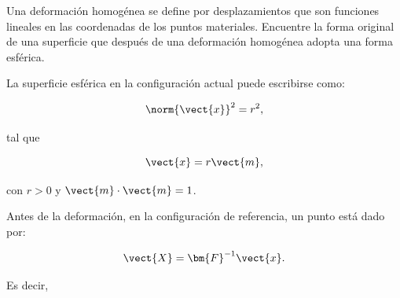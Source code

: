 \documentclass[../main.tex]{subfiles}
\begin{document}
\begin{problema}[3]
	Una deformación homogénea se define por desplazamientos que son funciones
	lineales en las coordenadas de los puntos materiales. Encuentre la forma
	original de una superficie que después de una deformación homogénea adopta
	una forma esférica.

	\startsolution

	La superficie esférica en la configuración actual puede escribirse como:

	\begin{equation}
		\norm{\vect{x}}^{2} = r^{2},
		\label{eq:spherical_surface}
	\end{equation}

	tal que

	\begin{equation}
		\vect{x} = r \vect{m},
		\label{eq:point_on_sphere}
	\end{equation}

	con \(r > 0\) y \(\vect{m} \cdot  \vect{m} = 1\).

	Antes de la deformación, en la configuración de referencia, un punto
	está dado por:

	\begin{equation}
		\vect{X} = \bm{F}^{-1}\vect{x}.
		\label{eq:point_reference_config}
	\end{equation}

	Es decir,


\end{problema}
\end{document}
